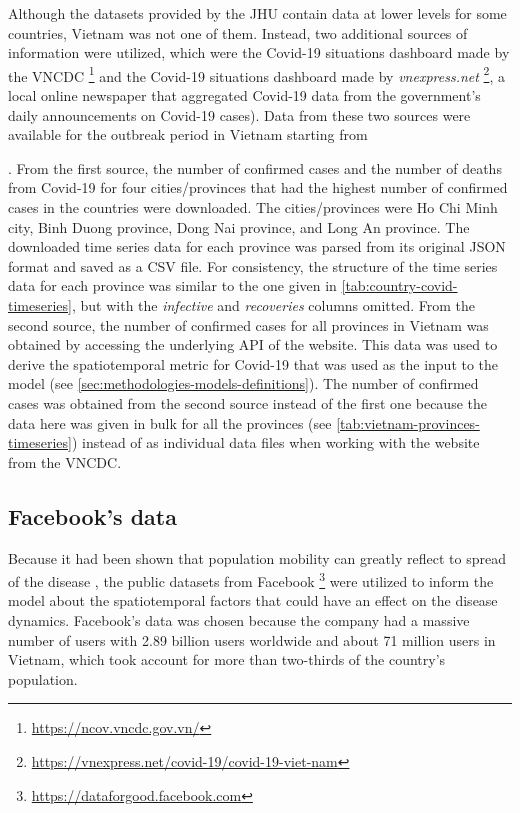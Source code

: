 Although the datasets provided by the \gls{JHU} contain data at lower levels for some countries, Vietnam was not one of them.
Instead, two additional sources of information were utilized, which were the Covid-19 situations dashboard made by the \gls{VNCDC} \footnote{\url{https://ncov.vncdc.gov.vn/}} and the Covid-19 situations dashboard made by \textit{vnexpress.net} \footnote{\url{https://vnexpress.net/covid-19/covid-19-viet-nam}}, a local online newspaper that aggregated Covid-19 data from the government's daily announcements on Covid-19 cases).
Data from these two sources were available for the outbreak period in Vietnam starting from \date{27th April 2021}.
From the first source, the number of confirmed cases and the number of deaths from Covid-19 for four cities/provinces that had the highest number of confirmed cases in the countries were downloaded.
The cities/provinces were Ho Chi Minh city, Binh Duong province, Dong Nai province, and Long An province.
The downloaded time series data for each province was parsed from its original \gls{JSON} format and saved as a \gls{CSV} file.
For consistency, the structure of the time series data for each province was similar to the one given in \autoref{tab:country-covid-timeseries}, but with the \textit{infective} and \textit{recoveries} columns omitted.
From the second source, the number of confirmed cases for all provinces in Vietnam was obtained by accessing the underlying \gls{API} of the website.
This data was used to derive the spatiotemporal metric for Covid-19 that was used as the input to the model (see \autoref{sec:methodologies-models-definitions}).
The number of confirmed cases was obtained from the second source instead of the first one because the data here was given in bulk for all the provinces (see \autoref{tab:vietnam-provinces-timeseries}) instead of as individual data files when working with the website from the \gls{VNCDC}.

\subsection{Facebook's data}
\label{sec:methodologies-data-mobility-data}

Because it had been shown that population mobility can greatly reflect to spread of the disease \cite{changMobilityNetworkModels2021,liSubstantialUndocumentedInfection2020,ihmecovid-19forecastingteamModelingCOVID19Scenarios2021}, the public datasets from Facebook \footnote{\url{https://dataforgood.facebook.com}} were utilized to inform the model about the spatiotemporal factors that could have an effect on the disease dynamics.
Facebook's data was chosen because the company had a massive number of users with 2.89 billion users worldwide and about 71 million users in Vietnam, which took account for more than two-thirds of the country's population.


